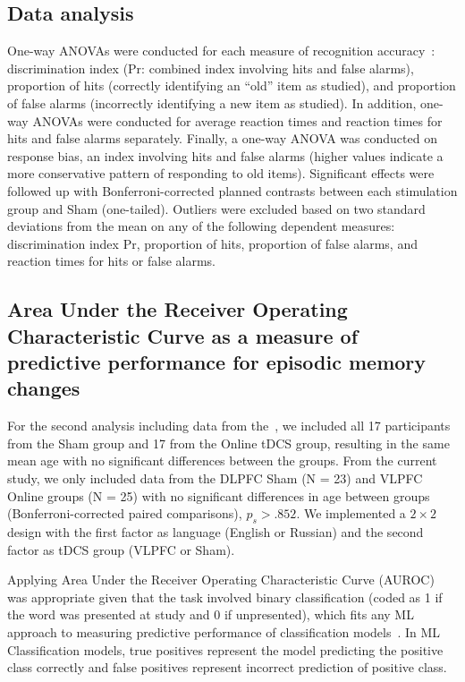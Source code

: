 \documentclass[10pt,letterpaper]{article}
\begin{document}
\subsection{Data analysis}
One-way ANOVAs were conducted for each measure of recognition accuracy~\cite{snodgrass1988pragmatics}: discrimination index (Pr: combined index involving hits and false alarms), proportion of hits (correctly identifying an “old” item as studied), and proportion of false alarms (incorrectly identifying a new item as studied). In addition, one-way ANOVAs were conducted for average reaction times and reaction times for hits and false alarms separately. Finally, a one-way ANOVA was conducted on response bias, an index involving hits and false alarms (higher values indicate a more conservative pattern of responding to old items). Significant effects were followed up with Bonferroni-corrected planned contrasts between each stimulation group and Sham (one-tailed). Outliers were excluded based on two standard deviations from the mean on any of the following dependent measures: discrimination index Pr, proportion of hits, proportion of false alarms, and reaction times for hits or false alarms. 

\subsection{Area Under the Receiver Operating Characteristic Curve as a measure of predictive performance for episodic memory changes}
For the second analysis including data from the~\cite{medvedeva2019effects}, we included all 17 participants from the Sham group and 17 from the Online tDCS group, resulting in the same mean age with no significant differences between the groups. From the current study, we only included data from the DLPFC Sham (N = 23) and VLPFC Online groups (N = 25) with no significant differences in age between groups (Bonferroni-corrected paired comparisons), \(p_s>.852\). We implemented a \(2 \times 2\) design with the first factor as language (English or Russian) and the second factor as tDCS group (VLPFC or Sham).

Applying Area Under the Receiver Operating Characteristic Curve (AUROC) was appropriate given that the task involved binary classification (coded as 1 if the word was presented at study and 0 if unpresented), which fits any ML approach to measuring predictive performance of classification models~\cite{bradley1997use}. In ML Classification models, true positives represent the model predicting the positive class correctly and false positives represent incorrect prediction of positive class.
\end{document}
